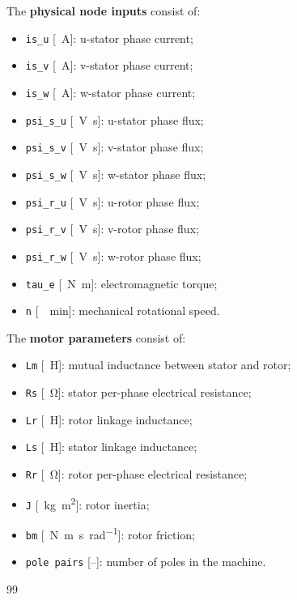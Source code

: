 \documentclass[12pt,a4paper]{scrartcl}
\begin{document}
\begin{onehalfspace}
\noindent The \textbf{physical node inputs} consist of: 
\begin{itemize}
	\item[--] \texttt{is\_u} [\SI{}{\ampere}]: u-stator phase current;
	\item[--] \texttt{is\_v} [\SI{}{\ampere}]: v-stator phase current;
	\item[--] \texttt{is\_w} [\SI{}{\ampere}]: w-stator phase current;
	\item[--] \texttt{psi\_s\_u} [\SI{}{\volt\second}]: u-stator phase flux;
	\item[--] \texttt{psi\_s\_v} [\SI{}{\volt\second}]: v-stator phase flux;
	\item[--] \texttt{psi\_s\_w} [\SI{}{\volt\second}]: w-stator phase flux;
	\item[--] \texttt{psi\_r\_u} [\SI{}{\volt\second}]: u-rotor phase flux;
	\item[--] \texttt{psi\_r\_v} [\SI{}{\volt\second}]: v-rotor phase flux;
	\item[--] \texttt{psi\_r\_w} [\SI{}{\volt\second}]: w-rotor phase flux;
	\item[--] \texttt{tau\_e} [\SI{}{\newton\meter}]: electromagnetic torque;
	\item[--] \texttt{n} [\SI{}{\per\minute}]: mechanical rotational speed.
\end{itemize} 

\noindent The \textbf{motor parameters} consist of:
\begin{itemize}
	\item[--] \texttt{Lm} [\SI{}{\henry}]: mutual inductance between stator and rotor;
	\item[--] \texttt{Rs} [\SI{}{\ohm}]: stator per-phase electrical resistance;
	\item[--] \texttt{Lr} [\SI{}{\henry}]: rotor linkage inductance;
	\item[--] \texttt{Ls} [\SI{}{\henry}]: stator linkage inductance;
	\item[--] \texttt{Rr} [\SI{}{\ohm}]: rotor per-phase electrical resistance;
	\item[--] \texttt{J} [\SI{}{\kilogram\square\meter}]: rotor inertia;
	\item[--] \texttt{bm} [\SI{}{\newton\meter\second\per\radian}]: rotor friction;
	\item[--] \texttt{pole pairs} [--]: number of poles in the machine.
\end{itemize}

\begin{thebibliography}{99}


\end{thebibliography}
\end{onehalfspace}
\end{document}
